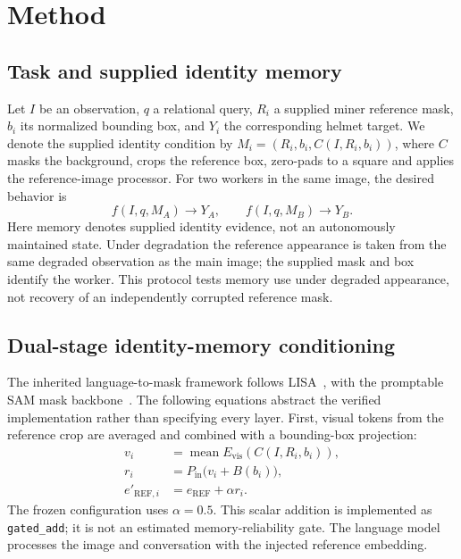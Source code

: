 \section{Method}
\label{sec:method}
\subsection{Task and supplied identity memory}
Let $I$ be an observation, $q$ a relational query, $R_i$ a supplied miner
reference mask, $b_i$ its normalized bounding box, and $Y_i$ the corresponding
helmet target. We denote the supplied identity condition by
$M_i=(R_i,b_i,C(I,R_i,b_i))$, where $C$ masks the background, crops the reference
box, zero-pads to a square and applies the reference-image processor.
For two workers in the same image, the desired behavior is
\begin{equation}
 f(I,q,M_A)\rightarrow Y_A,\qquad
 f(I,q,M_B)\rightarrow Y_B.
\end{equation}
Here memory denotes supplied identity evidence, not an autonomously maintained
state. Under degradation the reference appearance is taken from the same
degraded observation as the main image; the supplied mask and box identify the
worker. This protocol tests memory use under degraded appearance, not recovery
of an independently corrupted reference mask.

\subsection{Dual-stage identity-memory conditioning}
The inherited language-to-mask framework follows LISA~\cite{lai2024lisa},
with the promptable SAM mask backbone~\cite{kirillov2023segment}.
The following equations abstract the verified implementation rather than
specifying every layer. First, visual tokens from the reference crop are
averaged and combined with a bounding-box projection:
\begin{align}
 v_i &= \operatorname{mean} E_{\mathrm{vis}}(C(I,R_i,b_i)),\\
 r_i &= P_{\mathrm{in}}\bigl(v_i+B(b_i)\bigr),\\
 e'_{\mathrm{REF},i} &= e_{\mathrm{REF}}+\alpha r_i.
\end{align}
The frozen configuration uses $\alpha=0.5$. This scalar addition is implemented
as \texttt{gated\_add}; it is not an estimated memory-reliability gate. The
language model processes the image and conversation with the injected
reference embedding.

